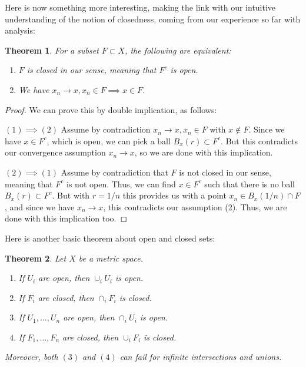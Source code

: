 \documentclass[12pt]{amsbook}
\newtheorem{theorem}{Theorem}[chapter]
\begin{document}
Here is now something more interesting, making the link with our intuitive understanding of the notion of closedness, coming from our experience so far with analysis:

\begin{theorem}
For a subset $F\subset X$, the following are equivalent:
\begin{enumerate}
\item $F$ is closed in our sense, meaning that $F^c$ is open.

\item We have $x_n\to x,x_n\in F\implies x\in F$.
\end{enumerate}
\end{theorem}

\begin{proof}
We can prove this by double implication, as follows:

\medskip

$(1)\implies(2)$ Assume by contradiction $x_n\to x,x_n\in F$ with $x\notin F$. Since we have $x\in F^c$, which is open, we can pick a ball $B_x(r)\subset F^c$. But this contradicts our convergence assumption $x_n\to x$, so we are done with this implication. 

\medskip

$(2)\implies(1)$ Assume by contradiction that $F$ is not closed in our sense, meaning that $F^c$ is not open. Thus, we can find $x\in F^c$ such that there is no ball $B_x(r)\subset F^c$. But with $r=1/n$ this provides us with a point $x_n\in B_x(1/n)\cap F$, and since we have $x_n\to x$, this contradicts our assumption (2). Thus, we are done with this implication too.
\end{proof}

Here is another basic theorem about open and closed sets:

\begin{theorem}
Let $X$ be a metric space.
\begin{enumerate}
\item If $U_i$ are open, then $\cup_iU_i$ is open.

\item If $F_i$ are closed, then $\cap_iF_i$ is closed.

\item If $U_1,\ldots,U_n$ are open, then $\cap_iU_i$ is open.

\item If $F_1,\ldots,F_n$ are closed, then $\cup_iF_i$ is closed.
\end{enumerate}
Moreover, both $(3)$ and $(4)$ can fail for infinite intersections and unions.
\end{theorem}
\end{document}
